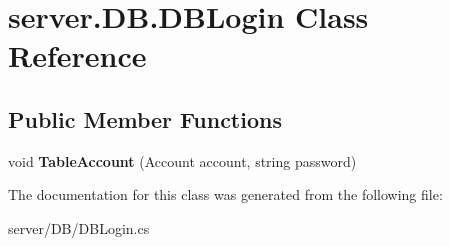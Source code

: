 \hypertarget{classserver_1_1DB_1_1DBLogin}{\section{server.\-D\-B.\-D\-B\-Login Class Reference}
\label{classserver_1_1DB_1_1DBLogin}
}
\subsection*{Public Member Functions}
\begin{DoxyCompactItemize}
\item 
\hypertarget{classserver_1_1DB_1_1DBLogin_a1fdcdcbdefddfaaeadcda4f3ba068995}{void {\bfseries Table\-Account} (Account account, string password)}\label{classserver_1_1DB_1_1DBLogin_a1fdcdcbdefddfaaeadcda4f3ba068995}

\end{DoxyCompactItemize}


The documentation for this class was generated from the following file\-:\begin{DoxyCompactItemize}
\item 
server/\-D\-B/D\-B\-Login.\-cs\end{DoxyCompactItemize}
